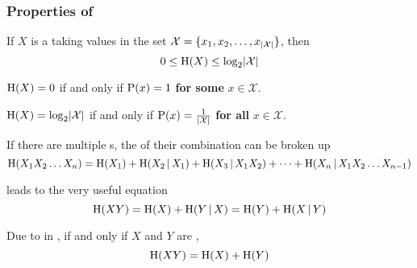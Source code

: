\subsubsection{Properties of }\label{subsubsec:Entropy_Properties}
\begin{propertylist}
\item If $X$ is a  taking values in the set $\mathcal{X} = \lbrace x_{1}, x_{2}, \ldots, x_{\lvert \mathcal{X} \rvert} \rbrace$, then\label{prop:Entropy_Bounds}
  \begin{equation}\label{eq:Entropy_Bounds}
    0 \leq \operatorname{\operatorname{H}}(X) \leq \log_{2} \lvert \mathcal{X} \rvert
  \end{equation}
\item $\operatorname{\operatorname{H}}(X) = 0$ if and only if $\operatorname{\operatorname{P}}(x) = 1$ \textbf{for some} $x \in \mathcal{X}$.\label{prop:Entropy_Min_Bound}
\item $\operatorname{\operatorname{H}}(X) = \log_{2} \lvert \mathcal{X} \rvert$ if and only if $\operatorname{\operatorname{P}}(x) = \frac{1}{\lvert \mathcal{X} \rvert}$ \textbf{for all} $x \in \mathcal{X}$.\label{prop:Entropy_Max_Bound}
\item If there are multiple s, the  of their combination can be broken up\label{prop:Entropy_Splitting}
  \begin{equation}\label{eq:Entropy_Splitting}
    \operatorname{\operatorname{H}}(X_{1}X_{2}\ldots X_{n}) = \operatorname{\operatorname{H}}(X_{1}) + \operatorname{\operatorname{H}}(X_{2} \operatorname{\vert} X_{1}) + \operatorname{\operatorname{H}}(X_{3} \operatorname{\vert} X_{1}X_{2}) + \cdots + \operatorname{\operatorname{H}}(X_{n} \operatorname{\vert} X_{1}X_{2} \ldots X_{n-1})
  \end{equation}
\item {} leads to the very useful equation\label{prop:Entropy_Multiple_Variable_Equivalence}
  \begin{equation}\label{eq:Entropy_Multiple_Variable_Equivalence}
    \operatorname{\operatorname{H}}(XY) = \operatorname{\operatorname{H}}(X) + \operatorname{\operatorname{H}}(Y \operatorname{\vert} X) = \operatorname{\operatorname{H}}(Y) + \operatorname{\operatorname{H}}(X \operatorname{\vert} Y)
  \end{equation}
\item Due to  in , if and only if $X$ and $Y$ are ,\label{prop:Entropy_Independent_Random_Variable}
  \begin{equation}\label{eq:Entropy_Independent_Random_Variable}
    \operatorname{\operatorname{H}}(XY) = \operatorname{\operatorname{H}}(X) + \operatorname{\operatorname{H}}(Y)
  \end{equation}
\end{propertylist}

